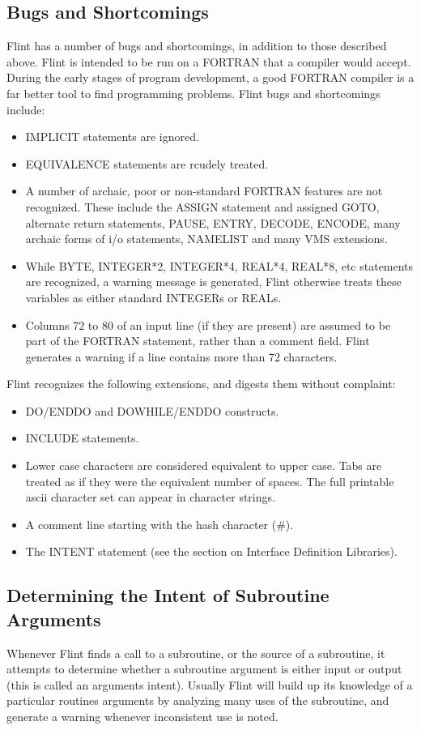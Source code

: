 \subsection{Bugs and Shortcomings}
Flint has a number of bugs and shortcomings, in addition to those described
above. Flint is intended to be run on a FORTRAN that a compiler would
accept. During the early stages of program development, a good FORTRAN compiler
is a far better tool to find programming problems. Flint bugs and
shortcomings include:
\begin{itemize}
\item IMPLICIT statements are ignored.
\item EQUIVALENCE statements are rcudely treated.
\item A number of archaic, poor or non-standard FORTRAN features are not
recognized. These include the ASSIGN statement and assigned GOTO, alternate
return statements, PAUSE, ENTRY, DECODE, ENCODE, many
archaic forms of i/o statements, NAMELIST and many VMS extensions.
\item While BYTE, INTEGER*2, INTEGER*4, REAL*4, REAL*8, etc statements are
recognized, a warning message is generated, Flint otherwise treats these
variables as either standard INTEGERs or REALs.
\item Columns 72 to 80 of an input line (if they are present) are assumed
to be part of the FORTRAN statement, rather than a comment field. Flint
generates a warning if a line contains more than 72 characters.
\end{itemize}
Flint recognizes the following extensions, and digests them without
complaint:
\begin{itemize}
\item DO/ENDDO and DOWHILE/ENDDO constructs.
\item INCLUDE statements.
\item Lower case characters are considered equivalent to upper case. Tabs
are treated as if they were the equivalent number of spaces. The full
printable ascii character set can appear in character strings.
\item A comment line starting with the hash character (\#).
\item The INTENT statement (see the section on Interface Definition Libraries).
\end{itemize}

\subsection{Determining the Intent of Subroutine Arguments}
Whenever Flint finds a call to a subroutine, or the source of a subroutine,
it attempts to determine whether a subroutine argument is either input or
output (this is called an arguments intent). Usually Flint will build up its
knowledge of a particular routines arguments by analyzing many uses of the
subroutine, and generate a warning whenever inconsistent use is noted.

